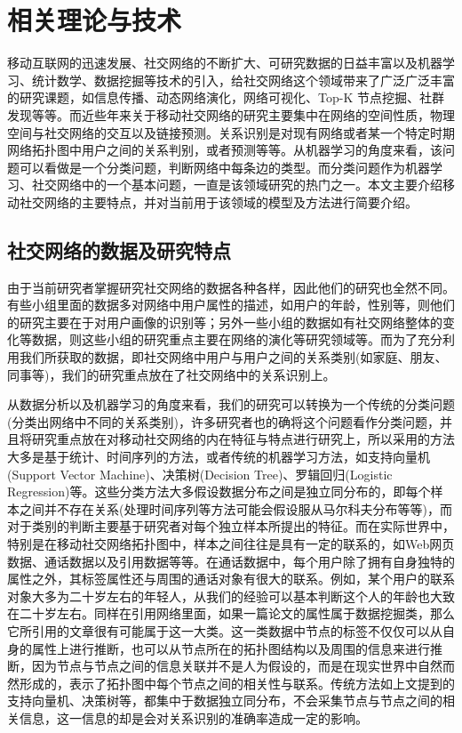 \chapter{相关理论与技术}
\qquad 移动互联网的迅速发展、社交网络的不断扩大、可研究数据的日益丰富以及机器学习、统计数学、数据挖掘等技术的引入，给社交网络这个领域带来了广泛广泛丰富的研究课题，如信息传播、动态网络演化，网络可视化、Top-K 节点挖掘、社群发现等等。而近些年来关于移动社交网络的研究主要集中在网络的空间性质，物理空间与社交网络的交互以及链接预测。关系识别是对现有网络或者某一个特定时期网络拓扑图中用户之间的关系判别，或者预测等等。从机器学习的角度来看，该问题可以看做是一个分类问题，判断网络中每条边的类型。而分类问题作为机器学习、社交网络中的一个基本问题，一直是该领域研究的热门之一。本文主要介绍移动社交网络的主要特点，并对当前用于该领域的模型及方法进行简要介绍。

\section{社交网络的数据及研究特点}

由于当前研究者掌握研究社交网络的数据各种各样，因此他们的研究也全然不同。有些小组里面的数据多对网络中用户属性的描述，如用户的年龄，性别等，则他们的研究主要在于对用户画像的识别等；另外一些小组的数据如有社交网络整体的变化等数据，则这些小组的研究重点主要在网络的演化等研究领域等。而为了充分利用我们所获取的数据，即社交网络中用户与用户之间的关系类别(如家庭、朋友、同事等)，我们的研究重点放在了社交网络中的关系识别上。

从数据分析以及机器学习的角度来看，我们的研究可以转换为一个传统的分类问题(分类出网络中不同的关系类别)，许多研究者也的确将这个问题看作分类问题，并且将研究重点放在对移动社交网络的内在特征与特点进行研究上，所以采用的方法大多是基于统计、时间序列的方法，或者传统的机器学习方法，如支持向量机(Support Vector Machine)、决策树(Decision Tree)、罗辑回归(Logistic Regression)等。这些分类方法大多假设数据分布之间是独立同分布的，即每个样本之间并不存在关系(处理时间序列等方法可能会假设服从马尔科夫分布等等)，而对于类别的判断主要基于研究者对每个独立样本所提出的特征。而在实际世界中，特别是在移动社交网络拓扑图中，样本之间往往是具有一定的联系的，如Web网页数据、通话数据以及引用数据等等。在通话数据中，每个用户除了拥有自身独特的属性之外，其标签属性还与周围的通话对象有很大的联系。例如，某个用户的联系对象大多为二十岁左右的年轻人，从我们的经验可以基本判断这个人的年龄也大致在二十岁左右。同样在引用网络里面，如果一篇论文的属性属于数据挖掘类，那么它所引用的文章很有可能属于这一大类。这一类数据中节点的标签不仅仅可以从自身的属性上进行推断，也可以从节点所在的拓扑图结构以及周围的信息来进行推断，因为节点与节点之间的信息关联并不是人为假设的，而是在现实世界中自然而然形成的，表示了拓扑图中每个节点之间的相关性与联系。传统方法如上文提到的支持向量机、决策树等，都集中于数据独立同分布，不会采集节点与节点之间的相关信息，这一信息的却是会对关系识别的准确率造成一定的影响。

